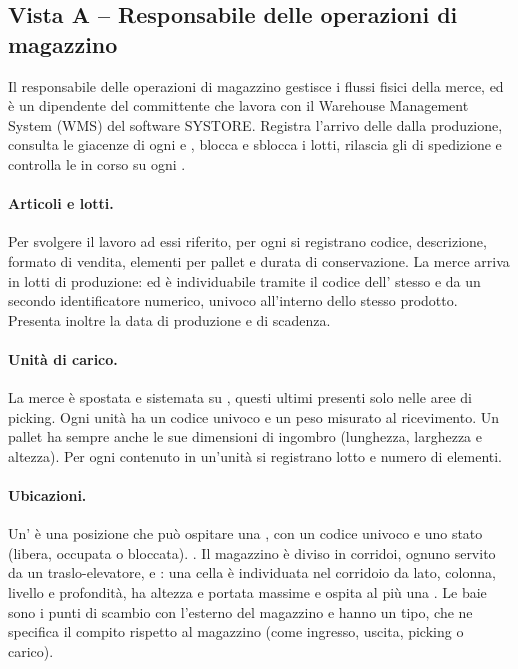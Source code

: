 \subsection{Vista A -- Responsabile delle operazioni di magazzino}
\label{sec:req-A}
Il responsabile delle operazioni di magazzino gestisce i flussi fisici della merce, ed è un dipendente
del committente che lavora con il Warehouse Management System (WMS) del software
SYSTORE. Registra l'arrivo delle  dalla produzione,
consulta le giacenze di ogni  e , blocca e sblocca i lotti, rilascia gli  di spedizione e
controlla le  in corso su ogni .

\paragraph{Articoli e lotti.}
Per svolgere il lavoro ad essi riferito, per ogni  si registrano codice, descrizione, formato di vendita,
elementi per pallet e durata di conservazione. La merce arriva in lotti di produzione:  ed è individuabile tramite il codice
dell' stesso e da un secondo identificatore numerico, univoco all'interno dello
stesso prodotto. Presenta inoltre la data di produzione e di scadenza.

\paragraph{Unità di carico.}
La merce è spostata e sistemata su , questi ultimi presenti solo nelle aree di picking. Ogni unità ha un codice univoco e un
peso misurato al ricevimento. Un pallet ha sempre anche le sue dimensioni di ingombro (lunghezza,
larghezza e altezza). Per ogni  contenuto in un'unità si registrano lotto e numero
di elementi.

\paragraph{Ubicazioni.}
Un' è una posizione che può ospitare una , con un
codice univoco e uno stato (libera, occupata o bloccata). . Il magazzino è diviso in corridoi, ognuno servito da un traslo-elevatore, e
: una cella è individuata nel corridoio da lato, colonna,
livello e profondità, ha altezza e portata massime e ospita al più una . Le
baie sono i punti di scambio con l'esterno del magazzino e hanno un tipo, che ne specifica il compito
rispetto al magazzino (come ingresso, uscita, picking o carico).

